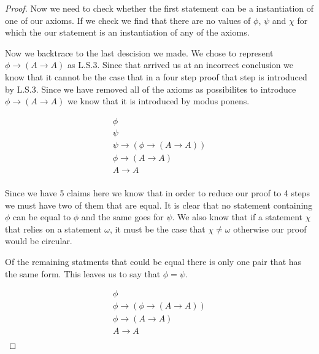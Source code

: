 \documentclass{article}
\begin{document}
\begin{proof}
Now we need to check whether the first statement can be a instantiation of one of our axioms.
If we check we find that there are no values of $\phi$, $\psi$ and $\chi$ for which the our statement is an instantiation of any of the axioms.

Now we backtrace to the last descision we made.
We chose to represent $\phi \rightarrow (A \rightarrow A)$ as L.S.3.
Since that arrived us at an incorrect conclusion we know that it cannot be the case that in a four step proof that step is introduced by L.S.3.
Since we have removed all of the axioms as possibilites to introduce $\phi \rightarrow (A \rightarrow A)$  we know that it is introduced by modus ponens.

\begin{gather*}
\phi \\
\psi \\
\psi \rightarrow (\phi \rightarrow (A \rightarrow A)) \\
\phi \rightarrow (A \rightarrow A) \tag*{MP} \\
A \rightarrow A \tag*{Modus Ponens}\\
\end{gather*}

Since we have 5 claims here we know that in order to reduce our proof to 4 steps we must have two of them that are equal.
It is clear that no statement containing $\phi$ can be equal to $\phi$ and the same goes for $\psi$.
We also know that if a statement $\chi$ that relies on a statement $\omega$, it must be the case that $\chi \neq \omega$ otherwise our proof would be circular.

Of the remaining statments that could be equal there is only one pair that has the same form.
This leaves us to say that $\phi = \psi$. 

\begin{gather*}
\phi \\
\phi \rightarrow (\phi \rightarrow (A \rightarrow A)) \\
\phi \rightarrow (A \rightarrow A) \tag*{MP} \\
A \rightarrow A \tag*{Modus Ponens}\\
\end{gather*}
\end{proof}
\end{document}
